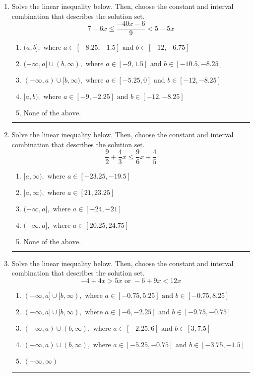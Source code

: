 \documentclass[14pt]{extbook}
\newcommand{\litem}[1]{\item#1\hspace*{-1cm}\rule{\textwidth}{0.4pt}}
\begin{document}
\begin{enumerate}
{\begin{enumerate}[label=\Alph*.]
\end{enumerate} }
\litem{
Solve the linear inequality below. Then, choose the constant and interval combination that describes the solution set.\[ 7 - 6 x \leq \frac{-40 x - 6}{9} < 5 - 5 x \]\begin{enumerate}[label=\Alph*.]
\item \( (a, b], \text{ where } a \in [-8.25, -1.5] \text{ and } b \in [-12, -6.75] \)
\item \( (-\infty, a] \cup (b, \infty), \text{ where } a \in [-9, 1.5] \text{ and } b \in [-10.5, -8.25] \)
\item \( (-\infty, a) \cup [b, \infty), \text{ where } a \in [-5.25, 0] \text{ and } b \in [-12, -8.25] \)
\item \( [a, b), \text{ where } a \in [-9, -2.25] \text{ and } b \in [-12, -8.25] \)
\item \( \text{None of the above.} \)

\end{enumerate} }
\litem{
Solve the linear inequality below. Then, choose the constant and interval combination that describes the solution set.\[ \frac{9}{2} + \frac{4}{3} x \leq \frac{9}{6} x + \frac{4}{5} \]\begin{enumerate}[label=\Alph*.]
\item \( [a, \infty), \text{ where } a \in [-23.25, -19.5] \)
\item \( [a, \infty), \text{ where } a \in [21, 23.25] \)
\item \( (-\infty, a], \text{ where } a \in [-24, -21] \)
\item \( (-\infty, a], \text{ where } a \in [20.25, 24.75] \)
\item \( \text{None of the above}. \)

\end{enumerate} }
\litem{
Solve the linear inequality below. Then, choose the constant and interval combination that describes the solution set.\[ -4 + 4 x > 5 x \text{ or } -6 + 9 x < 12 x \]\begin{enumerate}[label=\Alph*.]
\item \( (-\infty, a] \cup [b, \infty), \text{ where } a \in [-0.75, 5.25] \text{ and } b \in [-0.75, 8.25] \)
\item \( (-\infty, a] \cup [b, \infty), \text{ where } a \in [-6, -2.25] \text{ and } b \in [-9.75, -0.75] \)
\item \( (-\infty, a) \cup (b, \infty), \text{ where } a \in [-2.25, 6] \text{ and } b \in [3, 7.5] \)
\item \( (-\infty, a) \cup (b, \infty), \text{ where } a \in [-5.25, -0.75] \text{ and } b \in [-3.75, -1.5] \)
\item \( (-\infty, \infty) \)


\end{enumerate}}
\end{enumerate}
\end{document}
